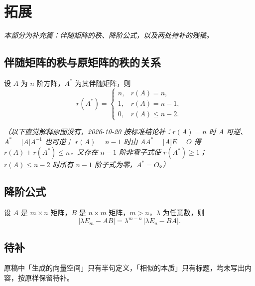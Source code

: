 
\section{拓展}
\noindent\textit{本部分为补充篇：伴随矩阵的秩、降阶公式，以及两处待补的残稿。}

\subsection{伴随矩阵的秩与原矩阵的秩的关系}
设 $A$ 为 $n$ 阶方阵，$A^{*}$ 为其伴随矩阵，则
\[
r(A^{*})=
\begin{cases}
n, & r(A)=n,\\[1mm]
1, & r(A)=n-1,\\[1mm]
0, & r(A)\le n-2.
\end{cases}
\]

\noindent\textit{（以下直觉解释原图没有，2026-10-20 按标准结论补：$r(A)=n$ 时 $A$ 可逆、$A^{*}=|A|A^{-1}$ 也可逆；
$r(A)=n-1$ 时由 $AA^{*}=|A|E=O$ 得 $r(A)+r(A^{*})\le n$，又存在 $n-1$ 阶非零子式使 $r(A^{*})\ge1$；
$r(A)\le n-2$ 时所有 $n-1$ 阶子式为零，$A^{*}=O$。）}

\subsection{降阶公式}
设 $A$ 是 $m\times n$ 矩阵，$B$ 是 $n\times m$ 矩阵，$m>n$，$\lambda$ 为任意数，则
\[
|\lambda E_m-AB|=\lambda^{m-n}\,|\lambda E_n-BA|.
\]

\subsection{待补}
原稿中「生成的向量空间」只有半句定义，「相似的本质」只有标题，均未写出内容，按原样保留待补。
